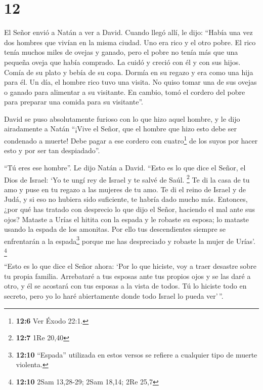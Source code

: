\hypertarget{section-11}{%
\section{12}\label{section-11}}

 El Señor envió a Natán a ver a David. Cuando llegó allí,
le dijo: ``Había una vez dos hombres que vivían en la misma ciudad. Uno
era rico y el otro pobre.  El rico tenía muchos miles de
ovejas y ganado,  pero el pobre no tenía más que una
pequeña oveja que había comprado. La cuidó y creció con él y con sus
hijos. Comía de su plato y bebía de su copa. Dormía en su regazo y era
como una hija para él.  Un día, el hombre rico tuvo una
visita. No quiso tomar una de sus ovejas o ganado para alimentar a su
visitante. En cambio, tomó el cordero del pobre para preparar una comida
para su visitante''.

 David se puso absolutamente furioso con lo que hizo aquel
hombre, y le dijo airadamente a Natán ``¡Vive el Señor, que el hombre
que hizo esto debe ser condenado a muerte!  Debe pagar a
ese cordero con cuatro\footnote{\textbf{12:6} Ver Éxodo 22:1.} de los
suyos por hacer esto y por ser tan despiadado''.

 ``Tú eres ese hombre''. Le dijo Natán a David. ``Esto es
lo que dice el Señor, el Dios de Israel: `Yo te ungí rey de Israel y te
salvé de Saúl. \footnote{\textbf{12:7} 1Re 20,40}  Te di
la casa de tu amo y puse en tu regazo a las mujeres de tu amo. Te di el
reino de Israel y de Judá, y si eso no hubiera sido suficiente, te
habría dado mucho más.  Entonces, ¿por qué has tratado con
desprecio lo que dijo el Señor, haciendo el mal ante sus ojos? Mataste a
Urías el hitita con la espada y le robaste su esposa; lo mataste usando
la espada de los amonitas.  Por ello tus descendientes
siempre se enfrentarán a la espada\footnote{\textbf{12:10} ``Espada''
  utilizada en estos versos se refiere a cualquier tipo de muerte
  violenta.} porque me has despreciado y robaste la mujer de Urías'.
\footnote{\textbf{12:10} 2Sam 13,28-29; 2Sam 18,14; 2Re 25,7}

 ``Esto es lo que dice el Señor ahora: `Por lo que
hiciste, voy a traer desastre sobre tu propia familia. Arrebataré a tus
esposas ante tus propios ojos y se las daré a otro, y él se acostará con
tus esposas a la vista de todos.  Tú lo hiciste todo en
secreto, pero yo lo haré abiertamente donde todo Israel lo pueda
ver'\,''.

